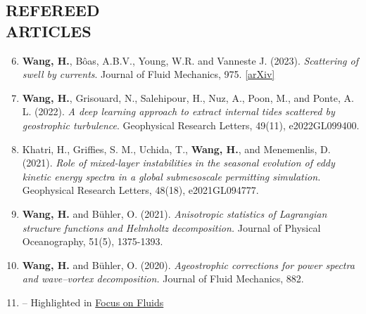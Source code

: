 \documentclass[margin]{res}
\newenvironment{benumerate}[1]{
    \let\oldItem\item
    \def\item{\addtocounter{enumi}{-2}\oldItem}
    \begin{enumerate}[leftmargin=*,noitemsep]
    \setcounter{enumi}{#1}
    \addtocounter{enumi}{1}
}{
    \end{enumerate}
}
\begin{document}
\begin{resume}


\section{{\normalfont REFEREED\\ARTICLES}}
\begin{benumerate}{5}
\item \textbf{Wang, H.}, B\^{o}as, A.B.V., Young, W.R. and Vanneste J. (2023). \textit{Scattering of swell by currents}. Journal of Fluid Mechanics, 975.  \href{https://arxiv.org/abs/2305.12163}{[arXiv]}
\item \textbf{Wang, H.}, Grisouard, N., Salehipour, H., Nuz, A., Poon, M., and Ponte, A. L. (2022). \textit{A deep learning approach to extract internal tides scattered by geostrophic turbulence}. Geophysical Research Letters, 49(11), e2022GL099400.
\item Khatri, H., Griffies, S. M., Uchida, T., \textbf{Wang, H.},  and Menemenlis, D. (2021). \textit{Role of mixed-layer instabilities in the seasonal evolution of eddy kinetic energy spectra in a global submesoscale permitting simulation.} Geophysical Research Letters, 48(18), e2021GL094777.
\item \textbf{Wang, H.} and B{\"u}hler, O. (2021). \textit{Anisotropic statistics of Lagrangian structure functions and Helmholtz decomposition.} Journal of Physical Oceanography, 51(5), 1375-1393.
\item \textbf{Wang, H.} and B{\"u}hler, O. (2020). \textit{Ageostrophic corrections for power spectra and wave–vortex decomposition.} Journal of Fluid Mechanics, 882.
\item[] -- Highlighted in \href{https://www.cambridge.org/core/journals/journal-of-fluid-mechanics/article/untangling-waves-and-vortices-in-the-atmospheric-kinetic-energy-spectra/1BEB1ABC32CD2CFAB99BAFEE4712CD0C}{Focus on Fluids}
\end{benumerate}


\end{resume}
\end{document}
